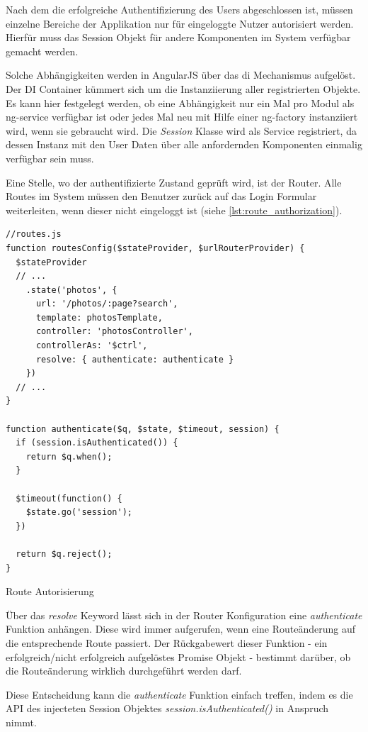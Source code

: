 Nach dem die erfolgreiche Authentifizierung des Users abgeschlossen ist, müssen einzelne Bereiche der Applikation nur für eingeloggte Nutzer autorisiert werden. Hierfür muss das Session Objekt für andere Komponenten im System verfügbar gemacht werden.

Solche Abhängigkeiten werden in AngularJS über das \gls{di} Mechanismus aufgelöst. Der DI Con­tai­ner kümmert sich um die Instanziierung aller registrierten Objekte. Es kann hier festgelegt werden, ob eine Abhängigkeit nur ein Mal pro Modul als \gls{ng-service} verfügbar ist oder jedes Mal neu mit Hilfe einer \gls{ng-factory} instanziiert wird, wenn sie gebraucht wird.
Die \textit{Session} Klasse wird als Service registriert, da dessen Instanz mit den User Daten über alle anfordernden Komponenten einmalig verfügbar sein muss.

Eine Stelle, wo der authentifizierte Zustand geprüft wird, ist der Router. Alle Routes im System müssen den Benutzer zurück auf das Login Formular weiterleiten, wenn dieser nicht eingeloggt ist (siehe \ref{lst:route_authorization}).

\begin{listing}[H]
\begin{verbatim}
//routes.js
function routesConfig($stateProvider, $urlRouterProvider) {
  $stateProvider
  // ...
    .state('photos', {
      url: '/photos/:page?search',
      template: photosTemplate,
      controller: 'photosController',
      controllerAs: '$ctrl',
      resolve: { authenticate: authenticate }
    })
  // ...
}

function authenticate($q, $state, $timeout, session) {
  if (session.isAuthenticated()) {
    return $q.when();
  }

  $timeout(function() {
    $state.go('session');
  })

  return $q.reject();
}

\end{verbatim}
\caption{Route Autorisierung}
\label{lst:route_authorization}
\end{listing}

Über das \textit{resolve} Keyword lässt sich in der Router Konfiguration eine \textit{authenticate} Funktion anhängen. Diese wird immer aufgerufen, wenn eine Routeänderung auf die entsprechende Route passiert. Der Rückgabewert dieser Funktion - ein erfolgreich/nicht erfolgreich aufgelöstes Promise Objekt - bestimmt darüber, ob die Routeänderung wirklich durchgeführt werden darf.

Diese Entscheidung kann die \textit{authenticate} Funktion einfach treffen, indem es die API des injecteten Session Objektes \textit{session.isAuthenticated()} in Anspruch nimmt.

